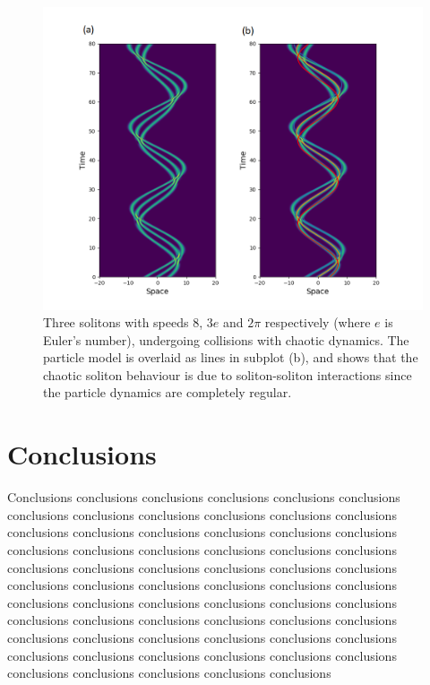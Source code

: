 \documentclass[10pt, twocolumn]{revtex4}    %
\begin{document}
\begin{figure}[h]
\includegraphics[width=\columnwidth]{chaotic.png}
\caption{Three solitons with speeds 8, $3e$ and $2\pi$ respectively (where $e$ is Euler's number), undergoing collisions with chaotic dynamics. The particle model is overlaid as lines in subplot (b), and shows that the chaotic soliton behaviour is due to soliton-soliton interactions since the particle dynamics are completely regular.}
\label{chaotic}
\end{figure}



\section{Conclusions}

Conclusions conclusions conclusions conclusions conclusions conclusions conclusions conclusions conclusions conclusions conclusions conclusions conclusions conclusions conclusions conclusions conclusions conclusions conclusions conclusions conclusions conclusions conclusions conclusions conclusions conclusions conclusions conclusions conclusions conclusions conclusions conclusions conclusions conclusions conclusions conclusions conclusions conclusions conclusions conclusions conclusions conclusions conclusions conclusions conclusions conclusions conclusions conclusions conclusions conclusions conclusions conclusions conclusions conclusions conclusions conclusions conclusions conclusions conclusions conclusions conclusions conclusions conclusions conclusions conclusions 
\end{document}
